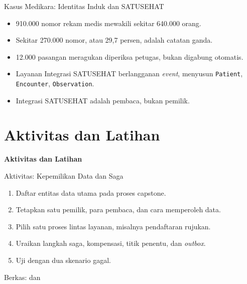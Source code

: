 \documentclass[aspectratio=169, table, 12pt]{beamer}
\begin{document}
\begin{frame}{{\Large Kasus Medikara: Identitas Induk dan SATUSEHAT}}
  \vspace{6pt}
  \small
  \begin{itemize}
    \item 910.000 nomor rekam medis mewakili sekitar 640.000 orang.
    \item Sekitar 270.000 nomor, atau 29,7 persen, adalah catatan ganda.
    \item 12.000 pasangan meragukan diperiksa petugas, bukan digabung otomatis.
    \item Layanan Integrasi SATUSEHAT berlangganan \textit{event}, menyusun
          \texttt{Patient}, \texttt{Encounter}, \texttt{Observation}.
    \item Integrasi SATUSEHAT adalah pembaca, bukan pemilik.
  \end{itemize}
\end{frame}

\section{Aktivitas dan Latihan}

\begin{frame}{\hfill}
  \centering
  \Huge{\textbf{Aktivitas dan Latihan}}
\end{frame}

\begin{frame}{{\Large Aktivitas: Kepemilikan Data dan Saga}}
  \small
  \begin{enumerate}
    \item Daftar entitas data utama pada proses capstone.
    \item Tetapkan satu pemilik, para pembaca, dan cara memperoleh data.
    \item Pilih satu proses lintas layanan, misalnya pendaftaran rujukan.
    \item Uraikan langkah saga, kompensasi, titik penentu, dan
          \textit{outbox}.
    \item Uji dengan dua skenario gagal.
  \end{enumerate}
  \vspace{4pt}
  {\footnotesize Berkas: 
  dan }
\end{frame}
\end{document}

